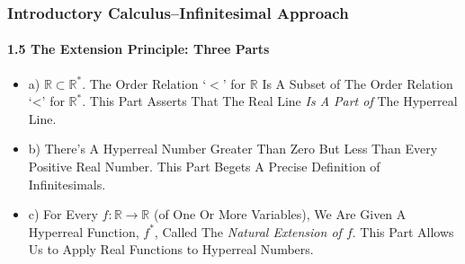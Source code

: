 \begin{frame}
\frametitle{Introductory Calculus--Infinitesimal Approach}
\framesubtitle{1.5 The Extension Principle: Three Parts}
\label{slide:1.5-06}
\begin{itemize}
\item a) $\mathbb{R}\subset\mathbb{R}^*$. The Order Relation `$<$' for $\mathbb{R}$ Is A Subset of The Order Relation `<' for $\mathbb{R}^*$. This Part Asserts That \alert{The Real Line \textit{Is A Part of} The Hyperreal Line}.
\pause\item b) \alert{There's A Hyperreal Number Greater Than Zero But Less Than Every Positive Real Number}. This Part Begets A Precise Definition of Infinitesimals.
\pause\item c) For Every $f:\mathbb{R}\rightarrow\mathbb{R}$ (of One Or More Variables), We Are Given \alert{A Hyperreal Function, $f^*$, Called The \textit{Natural Extension of $f$}}. This Part Allows Us to Apply Real Functions to Hyperreal Numbers.
\end{itemize}
\end{frame}
